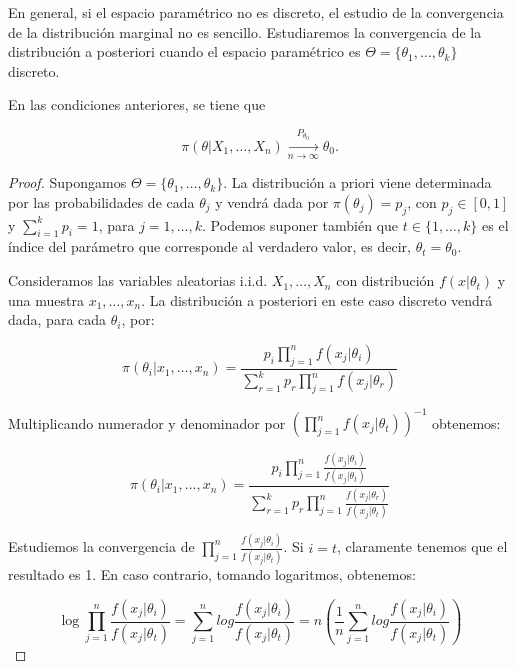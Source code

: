 \documentclass{article}
\begin{document}
En general, si el espacio paramétrico no es discreto, el estudio de la convergencia de la distribución marginal no es sencillo. Estudiaremos la convergencia de la distribución a posteriori cuando el espacio paramétrico es $\Theta = \{\theta_1,\dots,\theta_k\}$ discreto.


\begin{thm}
	En las condiciones anteriores, se tiene que

	\[\pi(\theta|X_1,\dots,X_n) \xrightarrow[n\to\infty]{P_{\theta_0}} \theta_0.\]
\end{thm}

\begin{proof}

	Supongamos $\Theta = \{\theta_1,\dots,\theta_k\}$. La distribución a priori viene determinada por las probabilidades de cada $\theta_j$ y vendrá dada por $\pi(\theta_j)=p_j$, con $p_j\in[0,1]$ y $\sum_{i=1}^{k}{p_i}=1$, para $j=1,\dots,k$. Podemos suponer también que $t\in\{1,\dots,k\}$ es el índice del parámetro que corresponde al verdadero valor, es decir, $\theta_t = \theta_0$.


	Consideramos las variables aleatorias i.i.d. $X_1,\dots,X_n$ con distribución $f(x|\theta_t)$ y una muestra $x_1,\dots,x_n$. La distribución a posteriori en este caso discreto vendrá dada, para cada $\theta_i$, por:

	\[\pi(\theta_i|x_1,\dots,x_n) = \frac{p_i \prod_{j=1}^n{f(x_j|\theta_i)}}{\sum_{r=1}^k{p_r\prod_{j=1}^n{f(x_j|\theta_r)}}}\]

	Multiplicando numerador y denominador por $\left(\prod_{j=1}^n{f(x_j|\theta_t)}\right)^{-1}$ obtenemos:

	\begin{equation} \label{eq:tcfd1}
		\pi(\theta_i|x_1,\dots,x_n) = \frac{p_i \prod_{j=1}^n{\frac{f(x_j|\theta_i)}{f(x_j|\theta_t)}}}{\sum_{r=1}^k{p_r\prod_{j=1}^n{\frac{f(x_j|\theta_r)}{f(x_j|\theta_t)}}}}
	\end{equation}


	Estudiemos la convergencia de $\prod_{j=1}^n{\frac{f(x_j|\theta_i)}{f(x_j|\theta_t)}}$. Si $i=t$, claramente tenemos que el resultado es 1. En caso contrario, tomando logaritmos, obtenemos:

	\begin{equation} \label{eq:tcfd2}
	\log{\prod_{j=1}^n{\frac{f(x_j|\theta_i)}{f(x_j|\theta_t)}}} = \sum_{j=1}^{n}{log{\frac{f(x_j|\theta_i)}{f(x_j|\theta_t)}}} = n\left(\frac{1}{n}\sum_{j=1}^{n}{log{\frac{f(x_j|\theta_i)}{f(x_j|\theta_t)}}}\right)
	\end{equation}


\end{proof}
\end{document}
